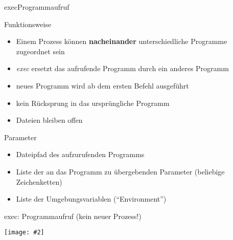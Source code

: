 \documentclass[utf8,9pt]{beamer}
\newcommand{\bild}[2][0.9\textwidth]{\texttt{[image: \#2]}}
\begin{document}
\begin{frame}{exec}{Programmaufruf}

  \begin{block}{Funktionsweise}
    \begin{itemize}
    \item Einem Prozess können {\bf nacheinander} unterschiedliche Programme
      zugeordnet sein
    \item {\em exec\/} ersetzt das aufrufende Programm durch ein
      anderes Programm
    \item neues Programm wird ab dem ersten Befehl ausgeführt
    \item kein Rücksprung in das ursprüngliche Programm
    \item Dateien bleiben offen
    \end{itemize}
  \end{block}

\begin{block}{Parameter}
\begin{itemize}
\item Dateipfad des aufzurufenden Programms
\item Liste der an das Programm zu übergebenden Parameter (beliebige Zeichenketten)
\item Liste der Umgebungsvariablen ("`Environment"')
\end{itemize}
\end{block}

\end{frame}





\begin{frame}{exec: Programmaufruf (kein neuer Prozess!)}{}

 \bild[0.7\textwidth]{bilder/exec01.pdf}

\end{frame}
\end{document}
